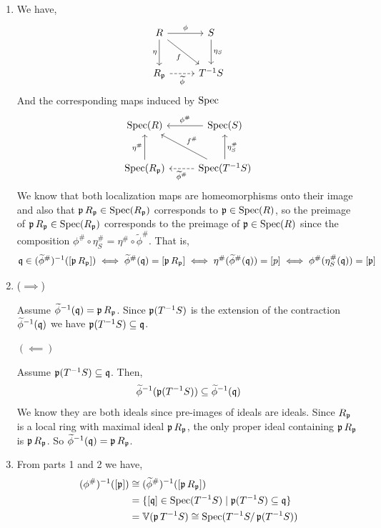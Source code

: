 \documentclass[Notebook.tex]{subfiles}
\begin{document}
\begin{solution}
    \bbni
    \begin{enumerate}
        \item We have, 
         \[
        \begin{tikzcd}[row sep=2.5em, column sep=2.5em]
            R \arrow[r, "\phi"] \ar[d, "\eta", swap] \arrow[dr, "f"'] & S \arrow[d, "\eta_S"] \\
            R_{\fp} \ar[dashed, r, "\widetilde{\phi}", swap] & T^{-1}S
        \end{tikzcd}
        \] 
        And the corresponding maps induced by $\Spec$ 
        \[
        \begin{tikzcd}[row sep=2.5em, column sep=2.5em]
            \Spec(R)  & \Spec(S)   \arrow[l, "\phi^{\#}"'] \\
            \Spec(R_{\fp}) \ar[u, "\eta^{\#}"]  & \Spec(T^{-1}S) \arrow[ul, "f^{\#}"'] \ar[u, "\eta_S^{\#}"'] \ar[dashed, l, "\widetilde{\phi}^{\#}", ] 
        \end{tikzcd}
        \] 
        We know that both localization maps are homeomorphisms onto their image and also that $\fp R_{\fp} \in \Spec(R_{\fp})$ corresponds to $\fp \in \Spec(R)$, so the preimage of $\fp R_{\fp} \in \Spec(R_{\fp})$ corresponds to the preimage of $\fp \in \Spec(R)$ since the composition $\phi^{\#} \circ \eta_S^{\#} = \eta^{\#} \circ  \widetilde{\phi}^{\#}$. That is, 
        \[\fq \in (\widetilde{\phi}^{\#})^{-1} ([\fp R_{\fp}]) \iff \widetilde{\phi}^{\#}(\fq) = [\fp R_{\fp}] \iff \eta^{\#}(\widetilde{\phi}^{\#}(\fq)) = [p] \iff \phi^{\#}(\eta_S^{\#}(\fq)) = [\fp]\]

        \item ($\implies$) 
        
        Assume $\widetilde{\phi}^{-1}(\fq) = \fp R_{\fp}$. Since $\fp (T^{-1}S)$ is the extension of the contraction $\widetilde{\phi}^{-1}(\fq)$ we have $\fp(T^{-1}S) \subseteq \fq$. 

        $(\impliedby)$ 

        Assume $\fp(T^{-1}S) \subseteq \fq$. Then, 
        \[\widetilde{\phi}^{-1}(\fp(T^{-1}S)) \subseteq \widetilde{\phi}^{-1}(\fq)\]
        We know they are both ideals since pre-images of ideals are ideals. Since $R_{\fp}$ is a local ring with maximal ideal $\fp R_{\fp}$, the only proper ideal containing $\fp R_{\fp}$ is $\fp R_{\fp}$. So $\widetilde{\phi}^{-1}(\fq) = \fp R_{\fp}$. 

        \item From parts 1 and 2 we have, 
        \begin{align*}
            (\phi^{\#})^{-1} ([\fp]) &\iso (\widetilde{\phi}^{\#})^{-1}([\fp R_{\fp}]) \\
            &= \{[\fq] \in \Spec(T^{-1}S) \mid \fp(T^{-1}S) \subseteq \fq\} \\
            &= \V(\fp T^{-1}S) \iso \Spec(T^{-1}S / \fp (T^{-1}S))
        \end{align*}


\end{enumerate}
\end{solution}
\end{document}
